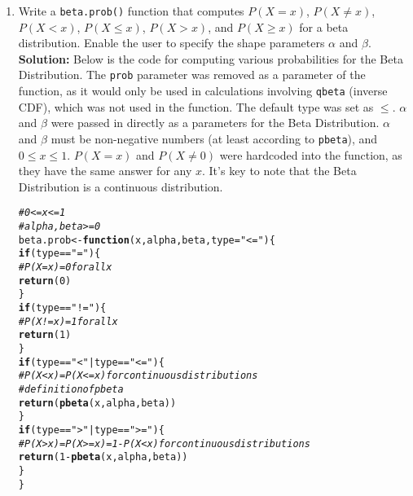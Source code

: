 \documentclass{article}\usepackage[]{graphicx}\usepackage[]{xcolor}
\makeatletter
\newcommand{\hlnum}[1]{\textcolor[rgb]{0.686,0.059,0.569}{#1}}%
\newcommand{\hlsng}[1]{\textcolor[rgb]{0.192,0.494,0.8}{#1}}%
\newcommand{\hlcom}[1]{\textcolor[rgb]{0.678,0.584,0.686}{\textit{#1}}}%
\newcommand{\hlopt}[1]{\textcolor[rgb]{0,0,0}{#1}}%
\newcommand{\hldef}[1]{\textcolor[rgb]{0.345,0.345,0.345}{#1}}%
\newcommand{\hlkwa}[1]{\textcolor[rgb]{0.161,0.373,0.58}{\textbf{#1}}}%
\newcommand{\hlkwb}[1]{\textcolor[rgb]{0.69,0.353,0.396}{#1}}%
\newcommand{\hlkwc}[1]{\textcolor[rgb]{0.333,0.667,0.333}{#1}}%
\newcommand{\hlkwd}[1]{\textcolor[rgb]{0.737,0.353,0.396}{\textbf{#1}}}%
\newenvironment{kframe}{%
 \def\at@end@of@kframe{}%
 \ifinner\ifhmode%
  \def\at@end@of@kframe{\end{minipage}}%
  \begin{minipage}{\columnwidth}%
 \fi\fi%
 \def\FrameCommand##1{\hskip\@totalleftmargin \hskip-\fboxsep
 \colorbox{shadecolor}{##1}\hskip-\fboxsep
     \hskip-\linewidth \hskip-\@totalleftmargin \hskip\columnwidth}%
 \MakeFramed {\advance\hsize-\width
   \@totalleftmargin\z@ \linewidth\hsize
   \@setminipage}}%
 {\par\unskip\endMakeFramed%
 \at@end@of@kframe}
\newenvironment{knitrout}{}{} %
\makeatother
\begin{document}
\begin{enumerate}
\begin{knitrout}
\begin{kframe}
\begin{alltt}
  \hldef{\}}
\hldef{\}}
\end{alltt}
\end{kframe}
\end{knitrout}
    \item Write a \texttt{beta.prob()} function that computes $P(X=x)$, 
    $P(X \neq x)$, $P(X<x)$, $P(X \leq x)$, $P(X > x)$, and $P(X \geq x)$
    for a beta distribution. Enable the user to specify the shape parameters
    $\alpha$ and $\beta$. \\
    \textbf{Solution:} Below is the code for computing various probabilities for the Beta Distribution. The \texttt{prob} parameter was removed as a parameter of the function, as it would only be used in calculations involving \texttt{qbeta} (inverse CDF), which was not used in the function. The default type was set as $\leq$. $\alpha$ and $\beta$ were passed in directly as a parameters for the Beta Distribution. $\alpha$ and $\beta$ must be non-negative numbers (at least according to \texttt{pbeta}), and $0 \leq x \leq 1$. $P(X = x)$ and $P(X \neq 0)$ were hardcoded into the function, as they have the same answer for any $x$. It's key to note that the Beta Distribution is a continuous distribution. 
\begin{knitrout}\scriptsize
{}\color{fgcolor}\begin{kframe}
\begin{alltt}
\hlcom{# 0 <= x <= 1}
\hlcom{# alpha, beta >= 0}
\hldef{beta.prob} \hlkwb{<-} \hlkwa{function}\hldef{(}\hlkwc{x}\hldef{,} \hlkwc{alpha}\hldef{,} \hlkwc{beta}\hldef{,} \hlkwc{type}\hldef{=}\hlsng{"<="}\hldef{)\{}
  \hlkwa{if} \hldef{(type} \hlopt{==} \hlsng{"="}\hldef{)\{}
    \hlcom{# P(X = x) = 0 for all x}
    \hlkwd{return}\hldef{(}\hlnum{0}\hldef{)}
  \hldef{\}}
  \hlkwa{if} \hldef{(type} \hlopt{==} \hlsng{"!="}\hldef{)\{}
    \hlcom{# P(X != x) = 1 for all x}
    \hlkwd{return}\hldef{(}\hlnum{1}\hldef{)}
  \hldef{\}}
  \hlkwa{if}\hldef{(type} \hlopt{==} \hlsng{"<"} \hlopt{|} \hldef{type} \hlopt{==} \hlsng{"<="}\hldef{)\{}
    \hlcom{# P(X < x) = P(X <= x) for continuous distributions}
    \hlcom{# definition of pbeta}
    \hlkwd{return}\hldef{(}\hlkwd{pbeta}\hldef{(x, alpha, beta))}
  \hldef{\}}
  \hlkwa{if} \hldef{(type} \hlopt{==} \hlsng{">"} \hlopt{|} \hldef{type} \hlopt{==} \hlsng{">="}\hldef{)\{}
    \hlcom{# P(X > x) = P(X >= x) = 1 - P(X < x) for continuous distributions }
    \hlkwd{return}\hldef{(}\hlnum{1} \hlopt{-} \hlkwd{pbeta}\hldef{(x, alpha, beta))}
  \hldef{\}}
\hldef{\}}
\end{alltt}
\end{kframe}
\end{knitrout}
\end{enumerate}

\end{document}
